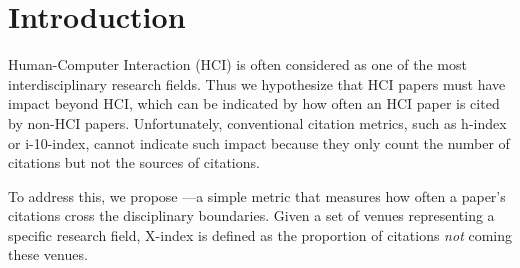 \section{Introduction}

Human-Computer Interaction (HCI) is often considered as one of the most interdisciplinary research fields.
% 
Thus we hypothesize that HCI papers must have impact beyond HCI, which can be indicated by how often an HCI paper is cited by non-HCI papers.
% 
Unfortunately, conventional citation metrics, such as h-index or i-10-index, cannot indicate such impact because they only count the number of citations but not the sources of citations.

To address this, we propose \xin---a simple metric that measures how often a paper's citations cross the disciplinary boundaries.
Given a set of venues representing a specific research field, X-index is defined as the proportion of citations {\it not} coming these venues.






